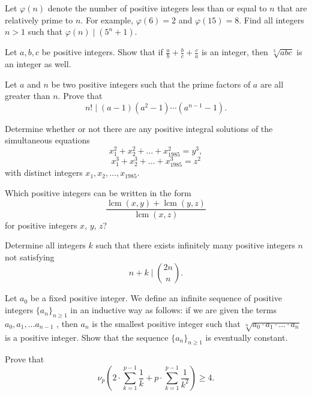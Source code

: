 \documentclass[mast]{lucky}
\begin{document}
\begin{req}[CMC 12B 2021/23]{6}
Let $\varphi(n)$ denote the number of positive integers less than or equal to $n$ that are relatively prime to $n.$ For example, $\varphi(6)=2$ and $\varphi(15)=8.$ Find all integers $n>1$ such that $\varphi(n) \mid (5^n+1)$.
\end{req}

\begin{req}[BAMO 2018/4]{6}
Let $a, b, c$ be positive integers. Show that if $\frac ab+\frac bc+\frac ca$ is an integer, then $\sqrt[3]{abc}$ is an integer as well.
\end{req}

\begin{prob}{6}
Let $a$ and $n$ be two positive integers such that the prime factors of $a$ are all greater than $n$. Prove that \[n!\mid (a-1)(a^2-1)\cdots (a^{n-1}-1).\]
\end{prob}

\begin{prob}[USAMO 1985/1]{6}
Determine whether or not there are any positive integral solutions of the simultaneous equations \[x_1^2+x_2^2+\dots+x_{1985}^2=y^3,\] \[x_1^3+x_2^3+\dots+x_{1985}^3=z^2\] with distinct integers $x_1,x_2,\dots,x_{1985}$.
\end{prob}

\begin{req}[USEMO 2020/1]{9}
Which positive integers can be written in the form \[\frac{\operatorname{lcm}(x, y) + \operatorname{lcm}(y, z)}{\operatorname{lcm}(x, z)}\]for positive integers $x$, $y$, $z$?
\end{req}

\begin{req}[China 2015/4]{9}
Determine all integers $k$ such that there exists infinitely many positive integers $n$ not satisfying \[n+k \mid\binom{2n}{n}.\]
\end{req}

\begin{prob}[Kosovo 2020/12.4]{9}
Let $a_0$ be a fixed positive integer. We define an infinite sequence of positive integers $\{a_n\}_{n\ge 1}$ in an inductive way as follows: if we are given the terms $a_0,a_1,...a_{n-1}$ , then $a_n$ is the smallest positive integer such that $\sqrt[n]{a_0\cdot a_1\cdot ...\cdot a_n}$ is a positive integer. Show that the sequence $\{a_n\}_{n\ge 1}$ is eventually constant.
\end{prob}

\begin{prob}[Dospinescu]{9}
Prove that \[\nu_p\left(2\cdot\sum_{k=1}^{p-1}\frac1k+p\cdot\sum_{k=1}^{p-1}\frac1{k^2}\right)\geq4.\]
\end{prob}
\end{document}
